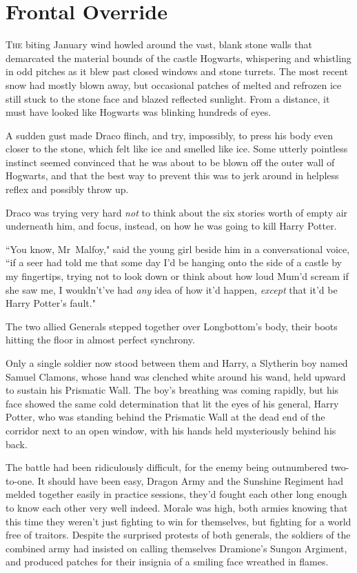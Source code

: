 \chapter{Frontal Override}

\lettrine{T}{he} biting January wind howled around the vast, blank stone walls that demarcated the material bounds of the castle Hogwarts, whispering and whistling in odd pitches as it blew past closed windows and stone turrets. The most recent snow had mostly blown away, but occasional patches of melted and refrozen ice still stuck to the stone face and blazed reflected sunlight. From a distance, it must have looked like Hogwarts was blinking hundreds of eyes.

A sudden gust made Draco flinch, and try, impossibly, to press his body even closer to the stone, which felt like ice and smelled like ice. Some utterly pointless instinct seemed convinced that he was about to be blown off the outer wall of Hogwarts, and that the best way to prevent this was to jerk around in helpless reflex and possibly throw up.

Draco was trying very hard \emph{not} to think about the six stories worth of empty air underneath him, and focus, instead, on how he was going to kill Harry Potter.

``You know, Mr~Malfoy," said the young girl beside him in a conversational voice, ``if a seer had told me that some day I'd be hanging onto the side of a castle by my fingertips, trying not to look down or think about how loud Mum'd scream if she saw me, I wouldn't've had \emph{any} idea of how it'd happen, \emph{except} that it'd be Harry Potter's fault."


The two allied Generals stepped together over Longbottom's body, their boots hitting the floor in almost perfect synchrony.

Only a single soldier now stood between them and Harry, a Slytherin boy named Samuel Clamons, whose hand was clenched white around his wand, held upward to sustain his Prismatic Wall. The boy's breathing was coming rapidly, but his face showed the same cold determination that lit the eyes of his general, Harry Potter, who was standing behind the Prismatic Wall at the dead end of the corridor next to an open window, with his hands held mysteriously behind his back.

The battle had been ridiculously difficult, for the enemy being outnumbered two-to-one. It should have been easy, Dragon Army and the Sunshine Regiment had melded together easily in practice sessions, they'd fought each other long enough to know each other very well indeed. Morale was high, both armies knowing that this time they weren't just fighting to win for themselves, but fighting for a world free of traitors. Despite the surprised protests of both generals, the soldiers of the combined army had insisted on calling themselves Dramione's Sungon Argiment, and produced patches for their insignia of a smiling face wreathed in flames.

